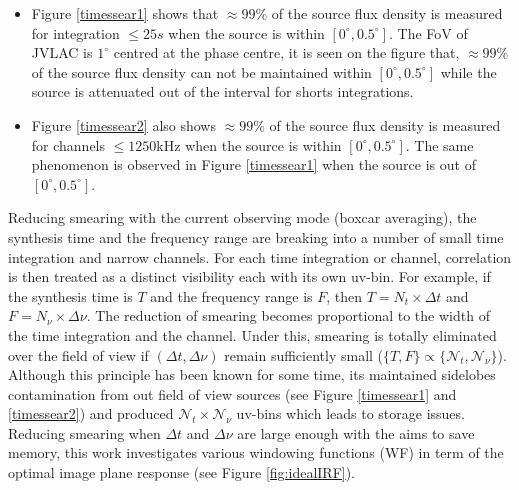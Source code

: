 \documentclass[useAMS,usenatbib]{mn2e}
\begin{document}
\begin{itemize}
 \item Figure \ref{timessear1} shows that $\approx 99\%$ of the source flux density is measured for integration $\leq 25s$ 
when the source is within $[0^\circ,0.5^\circ]$. The FoV of JVLAC  is $1^\circ$ centred at the phase centre, it is seen on 
the figure that, $\approx 99\%$ of the source flux density can not be maintained within $[0^\circ,0.5^\circ]$ while the source is attenuated
out of the interval for shorts integrations.
  \item Figure \ref{timessear2} also shows $\approx 99\%$ of the source flux density is measured for channels $\leq1250$kHz when the 
source is within $[0^\circ,0.5^\circ]$. The same phenomenon is observed in Figure \ref{timessear1} when the source is 
out of $[0^\circ,0.5^\circ]$.
\end{itemize}
Reducing smearing with the current observing mode (boxcar averaging), the synthesis time and the frequency range are breaking into a 
number of small time 
integration and narrow channels. For each time integration or channel, correlation  is then treated as a distinct visibility each with its 
own uv-bin.
For example, if the synthesis time is $T$ and the frequency range is $F$, then $T = N_t \times \Delta t$
and $F = N_{\nu}\times \Delta \nu$. The reduction of smearing becomes proportional to the width of the time integration and the channel. 
Under this, smearing is totally eliminated over the field of view if $(\Delta t, \Delta \nu)$ remain sufficiently small ($\{ T, F\} \propto 
\{\mathcal{N}_t, \mathcal{N}_{\nu}\}$). Although this principle has been known for some time, its  maintained sidelobes contamination from 
out field of view sources (see Figure \ref{timessear1} and \ref{timessear2}) and produced $\mathcal{N}_t\times\mathcal{N}_{\nu}$ 
uv-bins 
which leads to storage issues. Reducing smearing when 
$\Delta t$ and  $\Delta \nu$ are large enough with the aims to save memory, this work investigates various windowing functions (WF) in term 
of the 
optimal image plane response (see Figure \ref{fig:idealIRF}). 
\end{document}
